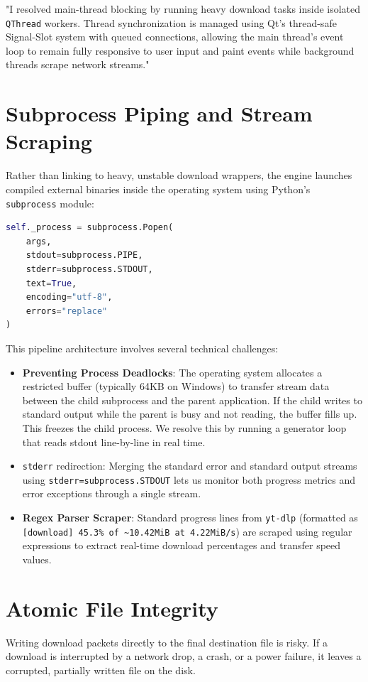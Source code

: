\documentclass[12pt]{report}
\newenvironment{resumepitch}{
    \begin{tcolorbox}[colback=quoteback,colframe=bordercolor,arc=2mm,boxrule=1pt,left=15pt,right=15pt,top=10pt,bottom=10pt]
    \itshape\color{primary}
}{
    \end{tcolorbox}
}
\begin{document}
\begin{resumepitch}
"I resolved main-thread blocking by running heavy download tasks inside isolated \texttt{QThread} workers. Thread synchronization is managed using Qt's thread-safe Signal-Slot system with queued connections, allowing the main thread's event loop to remain fully responsive to user input and paint events while background threads scrape network streams."
\end{resumepitch}

\section{Subprocess Piping and Stream Scraping}
Rather than linking to heavy, unstable download wrappers, the engine launches compiled external binaries inside the operating system using Python's \texttt{subprocess} module:
\begin{lstlisting}[language=Python]
self._process = subprocess.Popen(
    args,
    stdout=subprocess.PIPE,
    stderr=subprocess.STDOUT,
    text=True,
    encoding="utf-8",
    errors="replace"
)
\end{lstlisting}
This pipeline architecture involves several technical challenges:
\begin{itemize}[leftmargin=*]
    \item \textbf{Preventing Process Deadlocks}: The operating system allocates a restricted buffer (typically 64KB on Windows) to transfer stream data between the child subprocess and the parent application. If the child writes to standard output while the parent is busy and not reading, the buffer fills up. This freezes the child process. We resolve this by running a generator loop that reads stdout line-by-line in real time.
    \item \texttt{stderr} redirection: Merging the standard error and standard output streams using \texttt{stderr=subprocess.STDOUT} lets us monitor both progress metrics and error exceptions through a single stream.
    \item \textbf{Regex Parser Scraper}: Standard progress lines from \texttt{yt-dlp} (formatted as \texttt{[download]  45.3\% of \textasciitilde{}10.42MiB at 4.22MiB/s}) are scraped using regular expressions to extract real-time download percentages and transfer speed values.
\end{itemize}

\section{Atomic File Integrity}
Writing download packets directly to the final destination file is risky. If a download is interrupted by a network drop, a crash, or a power failure, it leaves a corrupted, partially written file on the disk. 
\end{document}
